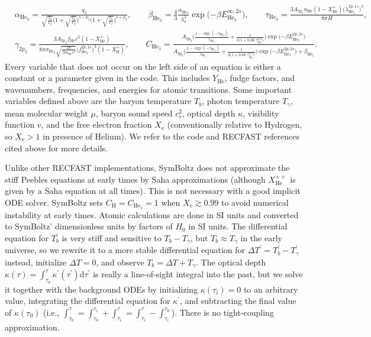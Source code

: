 \documentclass{aa}
\newcommand\el{\mathrm{e}}
\newcommand\Hy{\mathrm{H}}
\newcommand\He{\mathrm{He}}
\newcommand\Hesin{{\mathrm{He}_1}}
\newcommand\Hetri{{\mathrm{He}_3}}
\begin{document}
\begin{align*}
&
\alpha_\Hetri = \frac{q_3 }{ \sqrt{\frac{T_b}{T_2}} \Big(1+\sqrt{\frac{T_b}{T_2}}\Big)^{1-p_3} \Big(1+\sqrt{\frac{T_b}{T_1}}\Big)^{1+p_3} }, \qquad
\beta_\Hetri = \frac43 \frac{ \alpha_\Hetri }{ \lambda_\el^3 } \exp\big({-\beta E_\Hetri^{\infty,2s}}\big), \qquad
\tau_\Hetri = \frac{ 3 A_{2p_3} n_\He (1-X_\He^+) \big(\lambda_\Hetri^{2p,1s}\big)^3 }{ 8\pi H }, \\
&
\gamma_{2p_3} = \frac{ 3 A_{2p_3} f_\He c^2 (1-X_\He^+) }{ 8\pi \sigma_{\Hetri} \sqrt{\frac{2 \pi}{\beta m_\He c^2}} \big(f_\Hetri^{2p,1s}\big)^3 (1-X_\Hy^+) }, \qquad
C_\Hetri = \frac{ A_{2p_3} \bigg( \frac{1 - \exp({-\tau_\Hetri}) }{ \tau_\Hetri } + \frac{1}{3\big(1+0.66\,\gamma_{2p_3}^{0.9}\big)} \bigg) \exp\big({-\beta E_\Hetri^{2p,2s}}\big) }{ A_{2p_3} \bigg( \frac{1 - \exp({-\tau_\Hetri}) }{ \tau_\Hetri } + \frac{1}{3\big(1+0.66\,\gamma_{2p_3}^{0.9}\big)} \bigg) \exp\big({-\beta E_\Hetri^{2p,2s}}\big) + \beta_\Hetri } .
\end{align*}
Every variable that does not occur on the left side of an equation is either a constant or a parameter given in the code.
This includes $Y_\He$, fudge factors, and wavenumbers, frequencies, and energies for atomic transitions.
Some important variables defined above are the baryon temperature $T_b$, photon temperature $T_\gamma$, mean molecular weight $\mu$, baryon sound speed $c_s^2$, optical depth $\kappa$, visibility function $v$, and the free electron fraction $X_\el$ (conventionally relative to Hydrogen, so $X_\el > 1$ in presence of Helium).
We refer to the code and RECFAST references cited above for more details.

Unlike other RECFAST implementations, SymBoltz does not approximate the stiff Peebles equations at early times by Saha approximations (although $X_\He^{++}$ is given by a Saha equation at all times).
This is not necessary with a good implicit ODE solver.
SymBoltz sets $C_\Hy = C_\Hesin = 1$ when $X_\el \gtrsim 0.99$ to avoid numerical instability at early times.
Atomic calculations are done in SI units and converted to SymBoltz' dimensionless units by factors of $H_0$ in SI units.
The differential equation for $T_b^\prime$ is very stiff and sensitive to $T_b-T_\gamma$, but $T_b \approx T_\gamma$ in the early universe, so we rewrite it to a more stable differential equation for $\Delta T^\prime = T_b^\prime - T_\gamma^\prime$ instead, initialize $\Delta T = 0$, and observe $T_b = \Delta T + T_\gamma$.
The optical depth $\kappa(\tau) = \int_{\tau_0}^\tau \kappa^\prime(\tau^\prime) \mathrm{d}\tau^\prime$ is really a line-of-sight integral into the past,
but we solve it together with the background ODEs by initializing $\kappa(\tau_i) = 0$ to an arbitrary value, integrating the differential equation for $\kappa^\prime$, and subtracting the final value of $\kappa(\tau_0)$ (i.e., $\int_{\tau_0}^{\tau} = \int_{\tau_0}^{\tau_i} + \int_{\tau_i}^{\tau} = \int_{\tau_i}^{\tau} - \int_{\tau_i}^{\tau_0}$).
There is no tight-coupling approximation.
\end{document}
